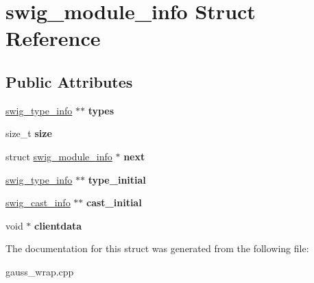 \hypertarget{structswig__module__info}{\section{swig\-\_\-module\-\_\-info Struct Reference}
\label{structswig__module__info}
}
\subsection*{Public Attributes}
\begin{DoxyCompactItemize}
\item 
\hypertarget{structswig__module__info_ad658c7738e9a035ef8eea865322fbf13}{\hyperlink{structswig__type__info}{swig\-\_\-type\-\_\-info} $\ast$$\ast$ {\bfseries types}}\label{structswig__module__info_ad658c7738e9a035ef8eea865322fbf13}

\item 
\hypertarget{structswig__module__info_aaf8907cf8509ee0464af8c9dfd909042}{size\-\_\-t {\bfseries size}}\label{structswig__module__info_aaf8907cf8509ee0464af8c9dfd909042}

\item 
\hypertarget{structswig__module__info_ac177d150b85ab77122089acf1f06d9c6}{struct \hyperlink{structswig__module__info}{swig\-\_\-module\-\_\-info} $\ast$ {\bfseries next}}\label{structswig__module__info_ac177d150b85ab77122089acf1f06d9c6}

\item 
\hypertarget{structswig__module__info_a76c7d5b0fc10371748616d0b6c815a17}{\hyperlink{structswig__type__info}{swig\-\_\-type\-\_\-info} $\ast$$\ast$ {\bfseries type\-\_\-initial}}\label{structswig__module__info_a76c7d5b0fc10371748616d0b6c815a17}

\item 
\hypertarget{structswig__module__info_a15f6b50a41f144afb1148fc412dc01f7}{\hyperlink{structswig__cast__info}{swig\-\_\-cast\-\_\-info} $\ast$$\ast$ {\bfseries cast\-\_\-initial}}\label{structswig__module__info_a15f6b50a41f144afb1148fc412dc01f7}

\item 
\hypertarget{structswig__module__info_a9fb6e461fcaf14c209049adfae4e9754}{void $\ast$ {\bfseries clientdata}}\label{structswig__module__info_a9fb6e461fcaf14c209049adfae4e9754}

\end{DoxyCompactItemize}


The documentation for this struct was generated from the following file\-:\begin{DoxyCompactItemize}
\item 
gauss\-\_\-wrap.\-cpp\end{DoxyCompactItemize}
